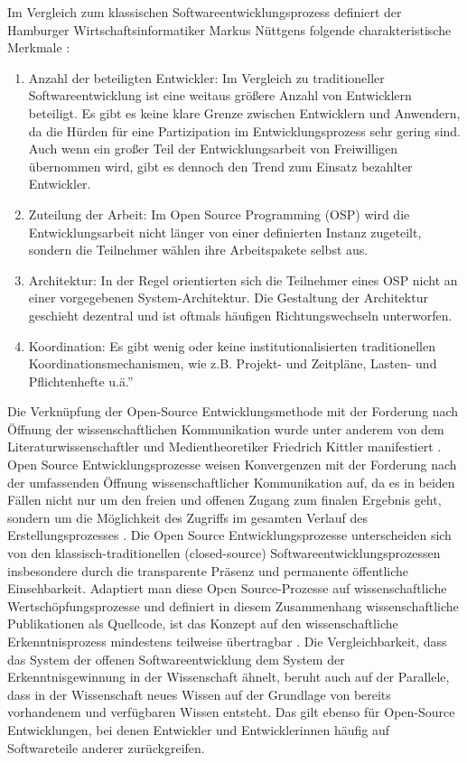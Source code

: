 Im Vergleich zum klassischen Softwareentwicklungsprozess definiert der Hamburger Wirtschaftsinformatiker Markus Nüttgens folgende charakteristische Merkmale \cite{nuttgens_2014}:
\begin{enumerate}
\item Anzahl der beteiligten Entwickler: Im Vergleich zu traditioneller Softwareentwicklung ist eine weitaus größere Anzahl von Entwicklern beteiligt. Es gibt es keine klare Grenze zwischen Entwicklern und Anwendern, da die Hürden für eine Partizipation im Entwicklungsprozess sehr gering sind. Auch wenn ein großer Teil der Entwicklungsarbeit von Freiwilligen übernommen wird, gibt es dennoch den Trend zum Einsatz bezahlter Entwickler.
\item Zuteilung der Arbeit: Im Open Source Programming (OSP) wird die Entwicklungsarbeit nicht länger von einer definierten Instanz zugeteilt, sondern die Teilnehmer wählen ihre Arbeitspakete selbst aus.
\item Architektur: In der Regel orientierten sich die Teilnehmer eines OSP nicht an einer vorgegebenen System-Architektur. Die Gestaltung der Architektur geschieht dezentral und ist oftmals häufigen Richtungswechseln unterworfen.
\item Koordination: Es gibt wenig oder keine institutionalisierten traditionellen Koordinationsmechanismen, wie z.B. Projekt- und Zeitpläne, Lasten- und Pflichtenhefte u.ä.” \cite{suchen}
\end{enumerate}

Die Verknüpfung der Open-Source Entwicklungsmethode mit der Forderung nach Öffnung der wissenschaftlichen Kommunikation wurde unter anderem von dem Literaturwissenschaftler und Medientheoretiker Friedrich Kittler manifestiert \cite{cite:1}. Open Source Entwicklungsprozesse weisen Konvergenzen mit der Forderung nach der umfassenden Öffnung wissenschaftlicher Kommunikation auf, da es in beiden Fällen nicht nur um den freien und offenen Zugang zum finalen Ergebnis geht, sondern um die Möglichkeit des Zugriffs im gesamten Verlauf des Erstellungsprozesses \cite{kelty_2004}. Die Open Source Entwicklungsprozesse unterscheiden sich von den klassisch-traditionellen (closed-source) Softwareentwicklungsprozessen insbesondere durch die transparente Präsenz und permanente öffentliche Einsehbarkeit. Adaptiert man diese Open Source-Prozesse auf wissenschaftliche Wertschöpfungsprozesse und definiert in diesem Zusammenhang wissenschaftliche Publikationen als Quellcode, ist das Konzept auf den wissenschaftliche Erkenntnisprozess mindestens teilweise übertragbar \cite{garcia_2010_open} \cite{Singh_2008} \cite{Bradley_2008} \cite{mantz_2007_open} \cite{dorschel_2006_open} \cite{Bradley_2007} \cite{Willinsky_2005}. Die Vergleichbarkeit, dass das System der offenen Softwareentwicklung dem System der Erkenntnisgewinnung in der Wissenschaft ähnelt, beruht auch auf der Parallele, dass in der Wissenschaft neues Wissen auf der Grundlage von bereits vorhandenem und verfügbaren Wissen entsteht. Das gilt ebenso für Open-Source Entwicklungen, bei denen Entwickler und Entwicklerinnen häufig auf Softwareteile anderer zurückgreifen.

